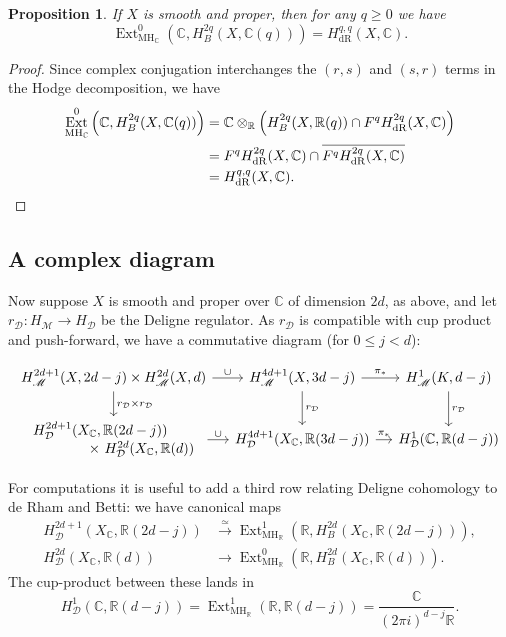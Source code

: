 \documentclass[11pt, a4paper, reqno]{amsart}
\theoremstyle{definition}
\theoremstyle{plain}
\newtheorem{proposition}[definition]{Proposition}
\theoremstyle{remark}
\DeclareMathOperator{\Ext}{Ext}
\DeclareMathOperator{\dR}{dR}
\DeclareMathOperator{\mot}{\mathscr{M}}
\newcommand{\numberset}{\mathbb}
\newcommand{\C}{\numberset{C}}
\newcommand{\R}{\numberset{R}}
\newcommand{\MH}{\mathrm{MH}}
\newcommand{\del}{\mathcal{D}}
\newcommand{\regulator}[1]{r_{#1}}
\newcommand{\rD}{\regulator{\del}}
\renewcommand{\ge}{\geqslant}
\renewcommand{\le}{\leqslant}
\begin{document}
  \begin{proposition}
   If $X$ is smooth and proper, then for any $q \ge 0$ we have
   \[ \Ext^0_{\MH_\C}\left(\C, H^{2q}_B(X, \C(q))\right) = H^{q, q}_{\dR}(X, \C). \]
  \end{proposition}
  
  \begin{proof} Since complex conjugation interchanges the $(r, s)$ and $(s, r)$ terms in the Hodge decomposition, we have
  \begin{align*}
   \Ext^0_{\MH_\C}\left(\C, H^{2q}_B(X, \C(q))\right) &= \C \otimes_{\R} \left( H^{2q}_B(X, \R(q)) \cap F^q H^{2q}_{\dR}(X, \C)\right) \\
   &= F^q H^{2q}_{\dR}(X, \C) \cap \overline{F^q H^{2q}_{\dR}(X, \C)} \\
   &= H^{q, q}_{\dR}(X, \C).\qedhere
  \end{align*}
  \end{proof}
 \subsection{A complex diagram}
   \label{sec:complex-diagram}
  
  Now suppose $X$ is smooth and proper over $\C$ of dimension $2d$, as above, and let $\rD \colon H_{\mot} \to H_{\del}$ be the Deligne regulator. As $\rD$ is compatible with cup product and push-forward, we have a commutative diagram (for $0 \le j < d$):

  \begin{equation}
   \label{diag:complex-compatibility}
   \begin{tikzcd}[column sep=small]
    H^{2d+1}_{\mot}(X,2d-j) \times H^{2d}_{\mot}(X,d) \arrow["\cup"]{r} \arrow["\rD \times \rD"]{d} &
    H^{4d+1}_{\mot}(X,3d-j) \arrow["\pi_*"]{r} \arrow["\rD"]{d} &
    H^1_{\mot}(K, d-j) \arrow[d,"\rD"] \\
    \begin{array}{l}
     H_{\del}^{2d+1}(X_{\C}, \R(2d-j)) \\[0.2ex]
    \qquad\qquad \times\  H_{\del}^{2d}(X_{\C}, \R(d))
    \end{array}
    \arrow["\cup"]{r} &
    H_{\del}^{4d+1}(X_{\C}, \R(3d-j)) \arrow["\pi_*"]{r} &
    H_{\del}^1(\C, \R(d-j))
   \end{tikzcd}
  \end{equation}

  For computations it is useful to add a third row relating Deligne cohomology to de Rham and Betti: we have canonical maps
  \[
   \begin{aligned}
    H_{\del}^{2d+1}(X_{\C},\R(2d-j)) &\xrightarrow{\simeq} \Ext^1_{\MH_\R}\left(\R, H_B^{2d}(X_{\C},\R(2d-j))\right),\\
    H_{\del}^{2d}(X_{\C},\R(d)) &\to \Ext^0_{\MH_\R}\left(\R, H_B^{2d}(X_{\C},\R(d))\right).
   \end{aligned}
  \]
  The cup-product between these lands in
  \[
   H^1_{\del}(\C, \R(d - j)) = \Ext^1_{\MH_\R}(\R, \R(d - j)) = \frac{\C}{(2\pi i)^{d-j}\R}.
  \]
\end{document}
